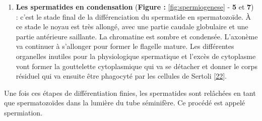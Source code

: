 \documentclass[12pt,twoside]{ugathesis}
\providecommand{\tightlist}{%
  \setlength{\itemsep}{0pt}\setlength{\parskip}{0pt}}
\theoremstyle{definition}
\theoremstyle{definition}
\theoremstyle{remark}
\begin{document}
\begin{enumerate}
\def\labelenumi{\arabic{enumi}.}
\setcounter{enumi}{2}
\tightlist
\item
  \textbf{Les spermatides en condensation} (\textbf{Figure :
  }\ref{fig:spermiogenese} - \textbf{5} et \textbf{7}) : c'est le stade
  final de la différenciation du spermatide en spermatozoïde. À ce stade
  le noyau est très allongé, avec une partie caudale globulaire et une
  partie antérieure saillante. La chromatine est sombre et condensée.
  L'axonème va continuer à s'allonger pour former le flagelle mature.
  Les différentes organelles inutiles pour la physiologique spermatique
  et l'excès de cytoplasme vont former la gouttelette cytoplasmique qui
  va se détacher et donner le corps résiduel qui va ensuite être
  phagocyté par les cellules de Sertoli
  {[}\protect\hyperlink{ref-Hermo2010}{22}{]}.
\end{enumerate}

Une fois ces étapes de différentiation finies, les spermatides sont
relâchées en tant que spermatozoïdes dans la lumière du tube séminifère.
Ce procédé est appelé spermiation.
\end{document}

